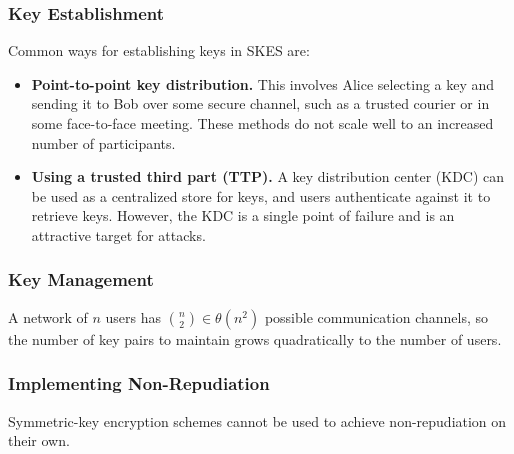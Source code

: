 \documentclass[12pt,titlepage]{article}
\begin{document}
      \subsubsection{Key Establishment}
        Common ways for establishing keys in SKES are:
        \begin{itemize}
          \item \textbf{Point-to-point key distribution.} This involves Alice selecting a key and sending it to Bob over
            some secure channel, such as a trusted courier or in some face-to-face meeting. These methods do not scale
            well to an increased number of participants.
          \item \textbf{Using a trusted third part (TTP).} A key distribution center (KDC) can be used as a centralized
            store for keys, and users authenticate against it to retrieve keys. However, the KDC is a single point of
            failure and is an attractive target for attacks.
        \end{itemize}

      \subsubsection{Key Management}
        A network of $n$ users has ${n \choose 2} \in \theta(n^2)$ possible communication channels, so the number of
        key pairs to maintain grows quadratically to the number of users.

      \subsubsection{Implementing Non-Repudiation}
        Symmetric-key encryption schemes cannot be used to achieve non-repudiation on their own.
\end{document}
